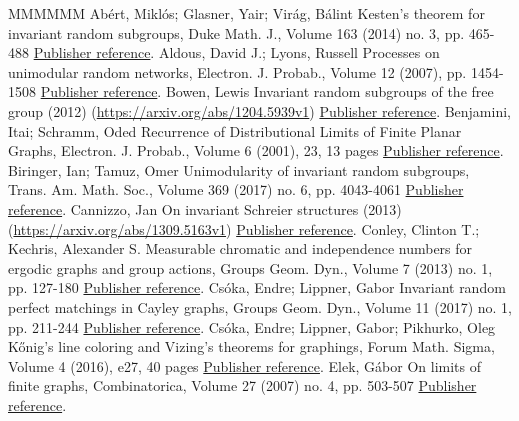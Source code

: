 \documentclass[11pt]{article}
\theoremstyle{definition}
\numberwithin{equation}{section}
\numberwithin{figure}{section}
\numberwithin{table}{section}
\begin{document}
\begin{thebibliography}{MMMMMM}
 Abért, Miklós; Glasner, Yair; Virág, Bálint Kesten’s theorem for invariant random subgroups, Duke Math. J., Volume 163 (2014) no. 3, pp. 465-488 \href{https://ahl.centre-mersenne.org/item/AHL_2021__4__1705_0/#abert2014kesten}{Publisher reference}.
 Aldous, David J.; Lyons, Russell Processes on unimodular random networks, Electron. J. Probab., Volume 12 (2007), pp. 1454-1508 \href{https://ahl.centre-mersenne.org/item/AHL_2021__4__1705_0/#aldous2007processes}{Publisher reference}.
 Bowen, Lewis Invariant random subgroups of the free group (2012) (\url{https://arxiv.org/abs/1204.5939v1}) \href{https://ahl.centre-mersenne.org/item/AHL_2021__4__1705_0/#bowen2012invariant}{Publisher reference}.
 Benjamini, Itai; Schramm, Oded Recurrence of Distributional Limits of Finite Planar Graphs, Electron. J. Probab., Volume 6 (2001), 23, 13 pages \href{https://ahl.centre-mersenne.org/item/AHL_2021__4__1705_0/#benjamini2001}{Publisher reference}.
 Biringer, Ian; Tamuz, Omer Unimodularity of invariant random subgroups, Trans. Am. Math. Soc., Volume 369 (2017) no. 6, pp. 4043-4061 \href{https://ahl.centre-mersenne.org/item/AHL_2021__4__1705_0/#biringer2017unimodularity}{Publisher reference}.
 Cannizzo, Jan On invariant Schreier structures (2013) (\url{https://arxiv.org/abs/1309.5163v1}) \href{https://ahl.centre-mersenne.org/item/AHL_2021__4__1705_0/#cannizzo2013invariant}{Publisher reference}.
 Conley, Clinton T.; Kechris, Alexander S. Measurable chromatic and independence numbers for ergodic graphs and group actions, Groups Geom. Dyn., Volume 7 (2013) no. 1, pp. 127-180 \href{https://ahl.centre-mersenne.org/item/AHL_2021__4__1705_0/#conley2013measurable}{Publisher reference}.
 Csóka, Endre; Lippner, Gabor Invariant random perfect matchings in Cayley graphs, Groups Geom. Dyn., Volume 11 (2017) no. 1, pp. 211-244 \href{https://ahl.centre-mersenne.org/item/AHL_2021__4__1705_0/#csoka2017invariant}{Publisher reference}.
 Csóka, Endre; Lippner, Gabor; Pikhurko, Oleg Kőnig’s line coloring and Vizing’s theorems for graphings, Forum Math. Sigma, Volume 4 (2016), e27, 40 pages \href{https://ahl.centre-mersenne.org/item/AHL_2021__4__1705_0/#csoka2016kHonig}{Publisher reference}.
 Elek, Gábor On limits of finite graphs, Combinatorica, Volume 27 (2007) no. 4, pp. 503-507 \href{https://ahl.centre-mersenne.org/item/AHL_2021__4__1705_0/#elek2007note}{Publisher reference}.

\end{thebibliography}
\end{document}
